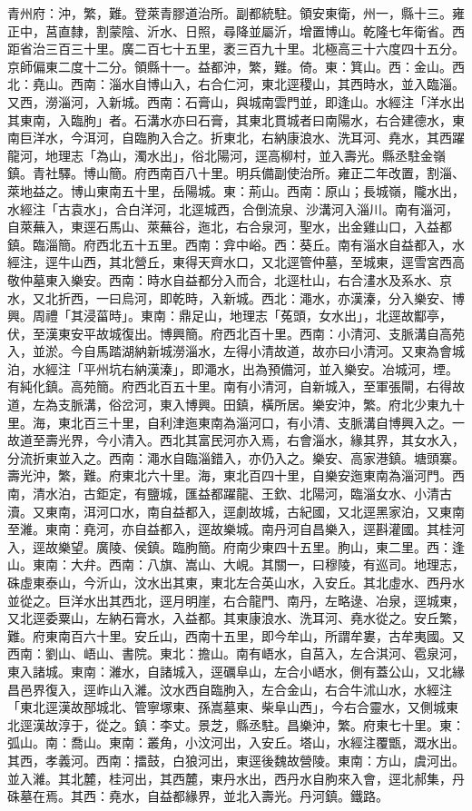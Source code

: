 \begin{pinyinscope}
青州府：沖，繁，難。登萊青膠道治所。副都統駐。領安東衛，州一，縣十三。雍正中，莒直隸，割蒙陰、沂水、日照，尋降並屬沂，增置博山。乾隆七年衛省。西距省治三百三十里。廣二百七十五里，袤三百九十里。北極高三十六度四十五分。京師偏東二度十二分。領縣十一。益都沖，繁，難。倚。東：箕山。西：金山。西北：堯山。西南：淄水自博山入，右合仁河，東北逕稷山，其西時水，並入臨淄。又西，澇淄河，入新城。西南：石膏山，與城南雲門並，即逢山。水經注「洋水出其東南，入臨朐」者。石溝水亦曰石膏，其東北貫城者曰南陽水，右合建德水，東南巨洋水，今洱河，自臨朐入合之。折東北，右納康浪水、洗耳河、堯水，其西躍龍河，地理志「為山，濁水出」，俗北陽河，逕高柳村，並入壽光。縣丞駐金嶺鎮。青社驛。博山簡。府西南百八十里。明兵備副使治所。雍正二年改置，割淄、萊地益之。博山東南五十里，岳陽城。東：荊山。西南：原山；長城嶺，隴水出，水經注「古袁水」，合白洋河，北逕城西，合倒流泉、沙溝河入淄川。南有淄河，自萊蕪入，東逕石馬山、萊蕪谷，迤北，右合泉河，聖水，出金雞山口，入益都鎮。臨淄簡。府西北五十五里。西南：弇中峪。西：葵丘。南有淄水自益都入，水經注，逕牛山西，其北營丘，東得天齊水口，又北逕管仲墓，至城東，逕雪宮西高敬仲墓東入樂安。西南：時水自益都分入而合，北逕杜山，右合澅水及系水、京水，又北折西，一曰烏河，即乾時，入新城。西北：澠水，亦漢溱，分入樂安、博興。周禮「其浸菑時」。東南：鼎足山，地理志「菟頭，女水出」，北逕故酅亭，伏，至漢東安平故城復出。博興簡。府西北百十里。西南：小清河、支脈溝自高苑入，並淤。今自馬踏湖納新城澇淄水，左得小清故道，故亦曰小清河。又東為會城泊，水經注「平州坑右納漢溱」，即澠水，出為預備河，並入樂安。冶城河，堙。有純化鎮。高苑簡。府西北百五十里。南有小清河，自新城入，至軍張閘，右得故道，左為支脈溝，俗岔河，東入博興。田鎮，橫所居。樂安沖，繁。府北少東九十里。海，東北百三十里，自利津迤東南為淄河口，有小清、支脈溝自博興入之。一故道至壽光界，今小清入。西北其富民河亦入焉，右會淄水，緣其界，其女水入，分流折東並入之。西南：澠水自臨淄錯入，亦仍入之。樂安、高家港鎮。塘頭寨。壽光沖，繁，難。府東北六十里。海，東北百四十里，自樂安迤東南為淄河門。西南，清水泊，古鉅定，有鹽城，匯益都躍龍、王欽、北陽河，臨淄女水、小清古瀆。又東南，洱河口水，南自益都入，逕劇故城，古紀國，又北逕黑家泊，又東南至濰。東南：堯河，亦自益都入，逕故樂城。南丹河自昌樂入，逕斟灌國。其桂河入，逕故樂望。廣陵、侯鎮。臨朐簡。府南少東四十五里。朐山，東二里。西：逢山。東南：大弁。西南：八旗、嵩山、大峴。其關一，曰穆陵，有巡司。地理志，硃虛東泰山，今沂山，汶水出其東，東北左合英山水，入安丘。其北虛水、西丹水並從之。巨洋水出其西北，逕月明崖，右合龍門、南丹，左略逯、冶泉，逕城東，又北逕委粟山，左納石膏水，入益都。其東康浪水、洗耳河、堯水從之。安丘繁，難。府東南百六十里。安丘山，西南十五里，即今牟山，所謂牟婁，古牟夷國。又西南：劉山、峿山、書院。東北：擔山。南有峿水，自莒入，左合淇河、雹泉河，東入諸城。東南：濰水，自諸城入，逕礪阜山，左合小峿水，側有蓋公山，又北緣昌邑界復入，逕岞山入濰。汶水西自臨朐入，左合金山，右合牛沭山水，水經注「東北逕漢故郚城北、管寧塚東、孫嵩墓東、柴阜山西」，今右合靈水，又側城東北逕漢故淳于，從之。鎮：李丈。景芝，縣丞駐。昌樂沖，繁。府東七十里。東：弧山。南：喬山。東南：叢角，小汶河出，入安丘。塔山，水經注覆甑，溉水出。其西，孝義河。西南：擂鼓，白狼河出，東逕後魏故營陵。東南：方山，虞河出。並入濰。其北麓，桂河出，其西麓，東丹水出，西丹水自朐來入會，逕北郝集，丹硃墓在焉。其西：堯水，自益都緣界，並北入壽光。丹河鎮。鐵路。
\end{pinyinscope}
